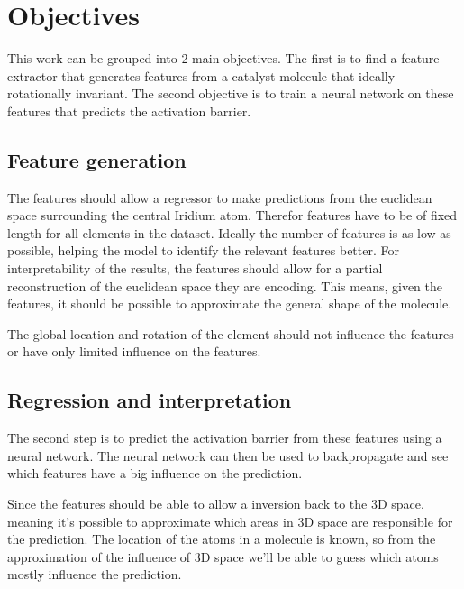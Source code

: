 \section{Objectives}

This work can be grouped into 2 main objectives. 
The first is to find a feature extractor that generates features from a catalyst molecule that ideally rotationally invariant.
The second objective is to train a neural network on these features that predicts the activation barrier.

\subsection{Feature generation}

The features should allow a regressor to make predictions from the euclidean space surrounding the central Iridium atom.
Therefor features have to be of fixed length for all elements in the dataset.
Ideally the number of features is as low as possible, helping the model to identify the relevant features better.
For interpretability of the results, the features should allow for a partial reconstruction of the euclidean space they are encoding.
This means, given the features, it should be possible to approximate the general shape of the molecule.

The global location and rotation of the element should not influence the features or have only limited influence on the features.

\subsection{Regression and interpretation}

The second step is to predict the activation barrier from these features using a neural network.
The neural network can then be used to backpropagate and see which features have a big influence on the prediction.

Since the features should be able to allow a inversion back to the 3D space, meaning it's possible to approximate which areas in 3D space are responsible for the prediction.
The location of the atoms in a molecule is known, so from the approximation of the influence of 3D space we'll be able to guess which atoms mostly influence the prediction.
